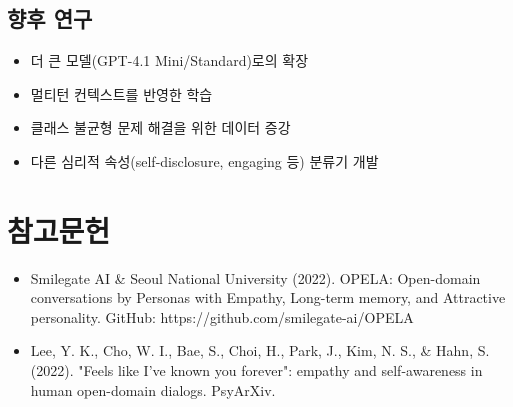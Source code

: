 \documentclass[11pt, a4paper]{article}
\begin{document}
\subsection{향후 연구}
\begin{itemize}
    \item 더 큰 모델(GPT-4.1 Mini/Standard)로의 확장
    \item 멀티턴 컨텍스트를 반영한 학습
    \item 클래스 불균형 문제 해결을 위한 데이터 증강
    \item 다른 심리적 속성(self-disclosure, engaging 등) 분류기 개발
\end{itemize}

\section{참고문헌}

\begin{itemize}
    \item Smilegate AI \& Seoul National University (2022). OPELA: Open-domain conversations by Personas with Empathy, Long-term memory, and Attractive personality. GitHub: https://github.com/smilegate-ai/OPELA
    \item Lee, Y. K., Cho, W. I., Bae, S., Choi, H., Park, J., Kim, N. S., \& Hahn, S. (2022). "Feels like I've known you forever": empathy and self-awareness in human open-domain dialogs. PsyArXiv.
\end{itemize}
\end{document}
